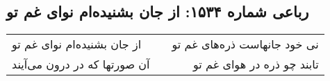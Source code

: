 \begin{center}
\section*{رباعی شماره ۱۵۳۴: از جان بشنیده‌ام نوای غم تو}
\label{sec:1534}
\begin{longtable}{l p{0.5cm} r}
از جان بشنیده‌ام نوای غم تو
&&
نی خود جانهاست ذره‌های غم تو
\\
آن صورتها که در درون می‌آیند
&&
تابند چو ذره در هوای غم تو
\\
\end{longtable}
\end{center}
